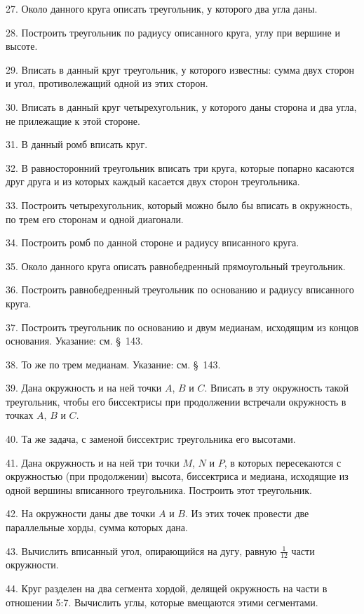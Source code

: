 \documentclass[oneside]{book}
\begin{document}
27.
Около данного круга описать треугольник, у которого два угла даны.

28.
Построить треугольник по радиусу описанного круга, углу при вершине и высоте.

29.
Вписать в данный круг треугольник, у которого известны:
сумма двух сторон и угол, противолежащий одной из этих сторон.

30.
Вписать в данный круг четырехугольник, у которого даны сторона и два угла, не прилежащие к этой стороне.

31.
В данный ромб вписать круг.

32.
В равносторонний треугольник вписать три круга, которые попарно касаются друг друга и из которых каждый касается двух сторон треугольника.

33.
Построить четырехугольник, который можно было бы вписать в окружность, по трем его сторонам и одной диагонали.

34.
Построить ромб по данной стороне и радиусу вписанного круга.

35.
Около данного круга описать равнобедренный прямоугольный треугольник.

36.
Построить равнобедренный треугольник по основанию и радиусу вписанного круга.

37.
Построить треугольник по основанию и двум медианам, исходящим из концов основания.
Указание:
см. §~143.

38.
То же по трем медианам.
Указание:
см. §~143.

39.
Дана окружность и на ней точки $A$, $B$ и $C$.
Вписать в эту окружность такой треугольник, чтобы его биссектрисы при продолжении встречали окружность в точках $A$, $B$ и $C$.

40.
Та же задача, с заменой биссектрис треугольника его высотами.

41.
Дана окружность и на ней три точки $M$, $N$ и $P$, в которых пересекаются с окружностью (при продолжении) высота, биссектриса и медиана, исходящие из одной вершины вписанного треугольника.
Построить этот треугольник.

42.
На окружности даны две точки $A$ и $B$.
Из этих точек провести две параллельные хорды, сумма которых дана.



43.
Вычислить вписанный угол, опирающийся на дугу, равную $\tfrac1{12}$ части окружности.

44.
Круг разделен на два сегмента хордой, делящей окружность на части в отношении 5:7.
Вычислить углы, которые вмещаются этими сегментами.
\end{document}
